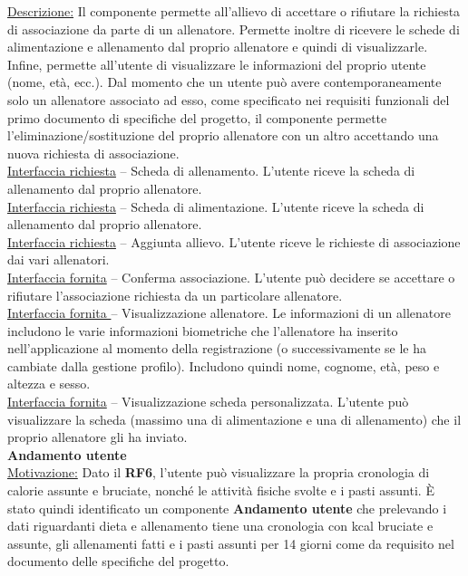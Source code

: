 \documentclass{article}
\begin{document}
      \underline{Descrizione:} Il componente permette all’allievo di accettare o rifiutare la richiesta di associazione da parte di un allenatore. Permette inoltre di ricevere le
      schede di alimentazione e allenamento dal proprio allenatore e quindi di visualizzarle. Infine, permette all’utente di visualizzare le informazioni del proprio utente (nome,
      età, ecc.). Dal momento che un utente può avere contemporaneamente solo un allenatore associato ad esso, come specificato nei requisiti funzionali del primo documento di
      specifiche del progetto, il componente permette l’eliminazione/sostituzione del proprio allenatore con un altro accettando una nuova richiesta di associazione.\\

      \underline{Interfaccia richiesta} –  Scheda di allenamento. L’utente riceve la scheda di allenamento dal proprio allenatore.\\

      \underline{Interfaccia richiesta} – Scheda di alimentazione. L’utente riceve la scheda di allenamento dal proprio allenatore.\\

      \underline{Interfaccia richiesta} – Aggiunta allievo. L’utente riceve le richieste di associazione dai vari allenatori.\\

      \underline{Interfaccia fornita} –  Conferma associazione. L’utente può decidere se accettare o rifiutare l’associazione richiesta da un particolare allenatore.\\

      \underline{Interfaccia fornita }– Visualizzazione allenatore. Le informazioni di un allenatore includono le varie informazioni biometriche che l’allenatore ha inserito\\
      nell’applicazione al momento della registrazione (o successivamente se le ha cambiate dalla gestione profilo). Includono quindi nome, cognome, età, peso e altezza e sesso.\\

      \underline{Interfaccia fornita} – Visualizzazione scheda personalizzata. L’utente può visualizzare la scheda (massimo una di alimentazione e una di allenamento) che il proprio
      allenatore gli ha inviato.\\


      {\Large\textbf{Andamento utente}}\\

      \underline{Motivazione:} Dato il \textbf{RF6}, l’utente può visualizzare la propria cronologia di calorie assunte e bruciate, nonché le attività fisiche svolte e i pasti assunti. È
      stato quindi identificato un componente \textbf{Andamento utente} che prelevando i dati riguardanti dieta e allenamento tiene una cronologia con kcal bruciate e assunte, gli allenamenti
      fatti e i pasti assunti per 14 giorni come da requisito nel documento delle specifiche del progetto.\\
\end{document}
